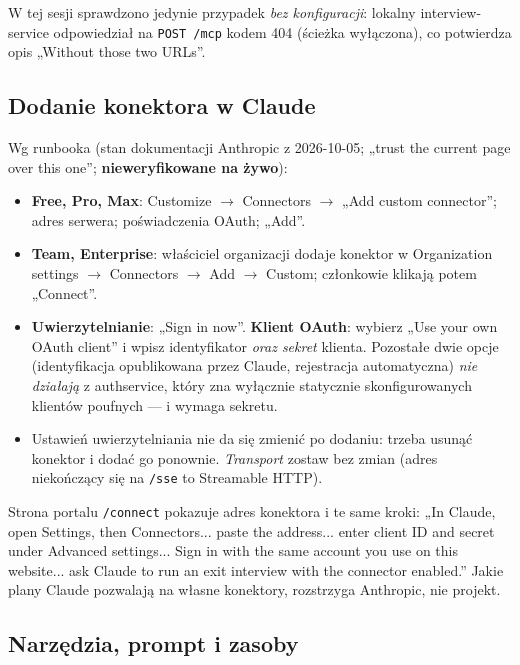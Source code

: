 {W tej sesji sprawdzono jedynie przypadek \emph{bez konfiguracji}: lokalny
interview-service odpowiedział na \texttt{POST /mcp} kodem 404 (ścieżka wyłączona),
co potwierdza opis „Without those two URLs”.

\subsection{Dodanie konektora w Claude}

Wg runbooka (stan dokumentacji Anthropic z 2026-10-05; „trust the current page
over this one”; \textbf{nieweryfikowane na żywo}):

\begin{itemize}[leftmargin=*,itemsep=2pt]
  \item \textbf{Free, Pro, Max}: Customize $\rightarrow$ Connectors $\rightarrow$
        „Add custom connector”; adres serwera; poświadczenia OAuth; „Add”.
  \item \textbf{Team, Enterprise}: właściciel organizacji dodaje konektor w
        Organization settings $\rightarrow$ Connectors $\rightarrow$ Add $\rightarrow$
        Custom; członkowie klikają potem „Connect”.
  \item \textbf{Uwierzytelnianie}: „Sign in now”. \textbf{Klient OAuth}: wybierz
        „Use your own OAuth client” i wpisz identyfikator \emph{oraz sekret} klienta.
        Pozostałe dwie opcje (identyfikacja opublikowana przez Claude, rejestracja
        automatyczna) \emph{nie działają} z authservice, który zna wyłącznie
        statycznie skonfigurowanych klientów poufnych --- i wymaga sekretu.
  \item Ustawień uwierzytelniania nie da się zmienić po dodaniu: trzeba usunąć
        konektor i dodać go ponownie. \emph{Transport} zostaw bez zmian
        (adres niekończący się na \texttt{/sse} to Streamable HTTP).
\end{itemize}

Strona portalu \texttt{/connect} pokazuje adres konektora i te same kroki:
„In Claude, open Settings, then Connectors... paste the address... enter client
ID and secret under Advanced settings... Sign in with the same account you use on
this website... ask Claude to run an exit interview with the connector
enabled.” Jakie plany Claude pozwalają na własne konektory, rozstrzyga Anthropic,
nie projekt.

\subsection{Narzędzia, prompt i zasoby}

}
